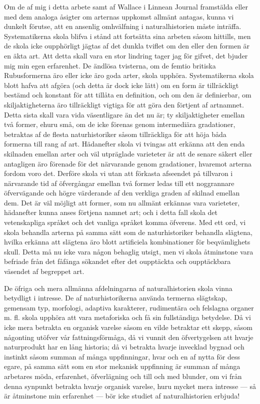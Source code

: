Om de af mig i detta arbete samt af Wallace i Linnean Journal framstälda eller med dem analoga åsigter om arternas uppkomst allmänt antagas, kunna vi dunkelt förutse, att en ansenlig omhvälfning i naturalhistorien måste inträffa. Systematikerna skola blifva i stånd att fortsätta sina arbeten såsom hittills, men de skola icke oupphörligt jägtas af det dunkla tviflet om den eller den formen är en äkta art. Att detta skall vara en stor lindring tager jag för gifvet, det bjuder mig min egen erfarenhet. De ändlösa tvisterna, om de femtio britiska Rubusformerna äro eller icke äro goda arter, skola upphöra. Systematikerna skola blott hafva att afgöra (och detta är dock icke lätt) om en form är tillräckligt bestämd och konstant för att tillåta en definition, och om den är definierbar, om skiljaktigheterna äro tillräckligt vigtiga för att göra den förtjent af artnamnet. Detta sista skall vara vida väsentligare än det nu är; ty skiljaktigheter emellan två former, ehuru små, om de icke förenas genom intermediära gradationer, betraktas af de flesta naturhistoriker såsom tillräckliga för att höja båda formerna till rang af art. Hädanefter skola vi tvingas att erkänna att den enda skilnaden emellan arter och väl utpräglade varieteter är att de senare säkert eller antagligen äro förenade för det närvarande genom gradationer, hvaremot arterna fordom voro det. Derföre skola vi utan att förkasta afseendet på tillvaron i närvarande tid af öfvergångar emellan två former ledas till ett noggrannare öfvervägande och högre värderande af den verkliga graden af skilnad emellan dem. Det är väl möjligt att former, som nu allmänt erkännas vara varieteter, hädanefter kunna anses förtjena namnet art; och i detta fall skola det vetenskapliga språket och det vanliga språket komma öfverens. Med ett ord, vi skola behandla arterna på samma sätt som de naturhistoriker behandla slägtena, hvilka erkänna att slägtena äro blott artificiela kombinationer för beqvämlighets skull. Detta må nu icke vara någon behaglig utsigt, men vi skola åtminstone vara befriade från det fåfänga sökandet efter det oupptäckta och oupptäckbara väsendet af begreppet art.

De öfriga och mera allmänna afdelningarna af naturalhistorien skola vinna betydligt i intresse. De af naturhistorikerna använda termerna slägtskap, gemensam typ, morfologi, adaptiva karakterer, rudimentära och felslagna organer m. fl. skola upphöra att vara metaforiska och få sin fullständiga betydelse. Då vi icke mera betrakta en organisk varelse såsom en vilde betraktar ett skepp, såsom någonting utöfver vår fattningsförmåga, då vi vunnit den öfvertygelsen att hvarje naturprodukt har en lång historia; då vi betrakta hvarje invecklad bygnad och instinkt såsom summan af många uppfinningar, hvar och en af nytta för dess egare, på samma sätt som en stor mekanisk uppfinning är summan af många arbetares möda, erfarenhet, öfverlägning och till och med blunder, om vi från denna synpunkt betrakta hvarje organisk varelse, huru mycket mera intresse — så är åtminstone min erfarenhet — bör icke studiet af naturalhistorien erbjuda!


